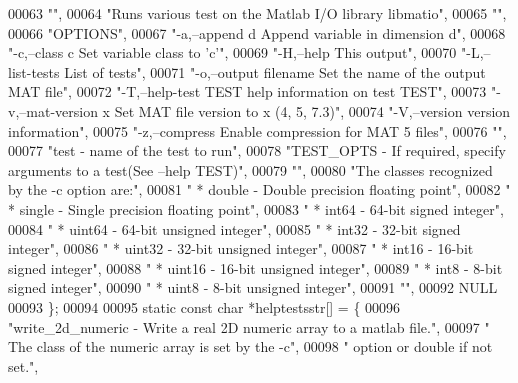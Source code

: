 \begin{DoxyCode}
00063     \textcolor{stringliteral}{""},
00064     \textcolor{stringliteral}{"Runs various test on the Matlab I/O library libmatio"},
00065     \textcolor{stringliteral}{""},
00066     \textcolor{stringliteral}{"OPTIONS"},
00067     \textcolor{stringliteral}{"-a,--append d        Append variable in dimension d"},
00068     \textcolor{stringliteral}{"-c,--class c         Set variable class to 'c'"},
00069     \textcolor{stringliteral}{"-H,--help            This output"},
00070     \textcolor{stringliteral}{"-L,--list-tests      List of tests"},
00071     \textcolor{stringliteral}{"-o,--output filename Set the name of the output MAT file"},
00072     \textcolor{stringliteral}{"-T,--help-test TEST  help information on test TEST"},
00073     \textcolor{stringliteral}{"-v,--mat-version x   Set MAT file version to x (4, 5, 7.3)"},
00074     \textcolor{stringliteral}{"-V,--version         version information"},
00075     \textcolor{stringliteral}{"-z,--compress        Enable compression for MAT 5 files"},
00076     \textcolor{stringliteral}{""},
00077     \textcolor{stringliteral}{"test        - name of the test to run"},
00078     \textcolor{stringliteral}{"TEST\_OPTS   - If required, specify arguments to a test(See --help TEST)"},
00079     \textcolor{stringliteral}{""},
00080     \textcolor{stringliteral}{"The classes recognized by the -c option are:"},
00081     \textcolor{stringliteral}{"  * double - Double precision floating point"},
00082     \textcolor{stringliteral}{"  * single - Single precision floating point"},
00083     \textcolor{stringliteral}{"  * int64  - 64-bit signed integer"},
00084     \textcolor{stringliteral}{"  * uint64 - 64-bit unsigned integer"},
00085     \textcolor{stringliteral}{"  * int32  - 32-bit signed integer"},
00086     \textcolor{stringliteral}{"  * uint32 - 32-bit unsigned integer"},
00087     \textcolor{stringliteral}{"  * int16  - 16-bit signed integer"},
00088     \textcolor{stringliteral}{"  * uint16 - 16-bit unsigned integer"},
00089     \textcolor{stringliteral}{"  * int8   - 8-bit signed integer"},
00090     \textcolor{stringliteral}{"  * uint8  - 8-bit unsigned integer"},
00091     \textcolor{stringliteral}{""},
00092     NULL
00093 \};
00094 
00095 \textcolor{keyword}{static} \textcolor{keyword}{const} \textcolor{keywordtype}{char} *helptestsstr[] = \{
00096 \textcolor{stringliteral}{"write\_2d\_numeric         - Write a real 2D numeric array to a matlab file."},
00097 \textcolor{stringliteral}{"                           The class of the numeric array is set by the -c"},
00098 \textcolor{stringliteral}{"                           option or double if not set."},

\end{DoxyCode}
